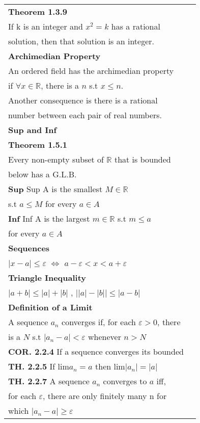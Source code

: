 \documentclass[10 pt,landscape]{article}
\begin{document}
\raggedright
\footnotesize
\begin{multicols}{4}


\begin{tabular}{@{}ll@{}}

\textbf{Theorem 1.3.9}\\
If k is an integer and $x^2=k$ has a rational \\solution, then that solution is an integer.\\
\textbf{Archimedian Property} \\
An ordered field has the archimedian property \\ if $\forall x \in \mathbb{R}$, there is a $n$ s.t $x\le n$.\\Another consequence is there is a rational\\ number between each pair of real numbers.\\
\textbf{Sup and Inf}\\
\textbf{Theorem 1.5.1} \\Every non-empty subset of $\mathbb{R}$ that is bounded\\ below has a G.L.B.\\
\textbf{Sup} Sup A is the smallest $M \in \mathbb{R}$ \\s.t $a\leq M$ for every $a \in A$\\
\textbf{Inf} Inf A is the largest $m \in \mathbb{R}$ s.t $m\leq a$ \\for every $a \in A$\\
\textbf{Sequences}\\
$|x-a| \le \varepsilon$ $\iff$ $a-\varepsilon <x<a+ \varepsilon$\\
\textbf{Triangle Inequality}\\
$|a+b|\leq |a|+|b|$ , $\lvert |a|-|b|\rvert \leq |a-b|$\\
\textbf{Definition of a Limit}\\
A sequence $a_n$ converges if, for each  $\varepsilon >0$, there \\ is a $N$ s.t 
$|a_n-a|<\varepsilon $ whenever $n>N$\\
\textbf{COR. 2.2.4} If a sequence converges its bounded\\
\textbf{TH. 2.2.5} If lim$a_n=a$ then lim$|a_n|=|a|$\\
\textbf{TH. 2.2.7} A sequence $a_n$ converges to $a$ iff,\\ for each $\varepsilon$, there are only finitely many n for\\ which $|a_n-a| \geq \varepsilon$\\

\end{tabular}
\end{multicols}
\end{document}
